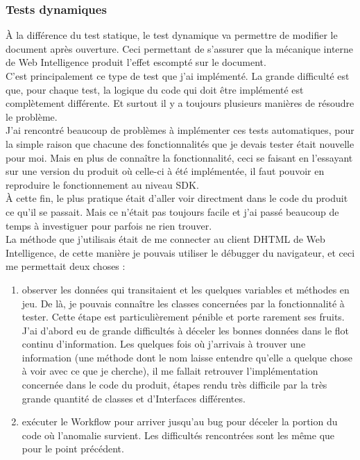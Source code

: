 \subsubsection{Tests dynamiques}

\`{A} la diff\'{e}rence du test statique, le test dynamique va permettre de modifier le document apr\`{e}s ouverture. Ceci permettant de s'assurer que la m\'{e}canique interne de Web Intelligence produit l'effet escompt\'{e} sur le document.\\
C'est principalement ce type de test que j'ai impl\'{e}ment\'{e}. La grande difficult\'{e} est que, pour chaque test, la logique du code qui doit \^{e}tre impl\'{e}ment\'{e} est compl\`{e}tement diff\'{e}rente. Et surtout il y a toujours plusieurs mani\`{e}res de r\'{e}soudre le probl\`{e}me.\\
J'ai rencontr\'{e} beaucoup de probl\`{e}mes \`{a} impl\'{e}menter ces tests automatiques, pour la simple raison que chacune des fonctionnalit\'{e}s que je devais tester \'{e}tait nouvelle pour moi. Mais en plus de conna\^{i}tre la fonctionnalit\'{e}, ceci se faisant en l'essayant sur une version du produit o\`{u} celle-ci \`{a} \'{e}t\'{e} impl\'{e}ment\'{e}e, il faut pouvoir en reproduire le fonctionnement au niveau SDK.\\
\`{A} cette fin, le plus pratique \'{e}tait d'aller voir directment dans le code du produit ce qu'il se passait. Mais ce n'\'{e}tait pas toujours facile et j'ai pass\'{e} beaucoup de temps \`{a} investiguer pour parfois ne rien trouver.\\
La m\'{e}thode que j'utilisais \'{e}tait de me connecter au client DHTML de Web Intelligence, de cette mani\`{e}re je pouvais utiliser le d\'{e}bugger du navigateur, et ceci me permettait deux choses :
\begin{enumerate}
	\item observer les donn\'{e}es qui transitaient et les quelques variables et m\'{e}thodes en jeu. De l\`{a}, je pouvais conna\^{i}tre les classes concern\'{e}es par la fonctionnalit\'{e} \`{a} tester. Cette \'{e}tape est particuli\`{e}rement p\'{e}nible et porte rarement ses fruits. J'ai d'abord eu de grande difficult\'{e}s \`{a} d\'{e}celer les bonnes donn\'{e}es dans le flot continu d'information. Les quelques fois o\`{u} j'arrivais \`{a} trouver une information (une m\'{e}thode dont le nom laisse entendre qu'elle a quelque chose \`{a} voir avec ce que je cherche), il me fallait retrouver l'impl\'{e}mentation concern\'{e}e dans le code du produit, \'{e}tapes rendu tr\`{e}s difficile par la tr\`{e}s grande quantit\'{e} de classes et d'\gls{Interface}s diff\'{e}rentes.
	\item ex\'{e}cuter le \gls{Workflow} pour arriver jusqu'au bug pour d\'{e}celer la portion du code o\`{u} l'anomalie survient. Les difficult\'{e}s rencontr\'{e}es sont les m\^{e}me que pour le point pr\'{e}c\'{e}dent.
\end{enumerate}


